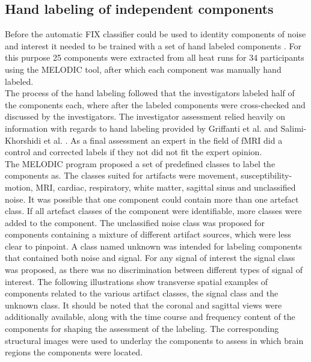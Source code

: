 \subsection{Hand labeling of independent components}
Before the automatic FIX classifier could be used to identity components of noise and interest it needed to be trained with a set of hand labeled components \cite{Salimi-Khorshidi2014}. For this purpose 25 components were extracted from all heat runs for 34 participants using the MELODIC tool, after which each component was manually hand labeled. \\
The process of the hand labeling followed that the investigators labeled half of the components each, where after the labeled components were cross-checked and discussed by the investigators. The investigator assessment relied heavily on information with regards to hand labeling provided by Griffanti et al. \cite{Griffanti2017} and Salimi-Khorshidi et al. \cite{Salimi-Khorshidi2014}. As a final assessment an expert in the field of fMRI did a control and corrected labels if they not did not fit the expert opinion. \\
The MELODIC program proposed a set of predefined classes to label the components as. The classes suited for artifacts were movement, susceptibility-motion, MRI, cardiac, respiratory, white matter, sagittal sinus and unclassified noise. It was possible that one component could contain more than one artefact class. If all artefact classes of the component were identifiable, more classes were added to the component. The unclassified noise class was proposed for components containing a mixture of different artifact sources, which were less clear to pinpoint. A class named unknown was intended for labeling components that contained both noise and signal. For any signal of interest the signal class was proposed, as there was no discrimination between different types of signal of interest. 
The following illustrations show transverse spatial examples of components related to the various artifact classes, the signal class and the unknown class. It should be noted that the coronal and sagittal views were additionally available, along with the time course and frequency content of the components for shaping the assessment of the labeling. The corresponding structural images were used to underlay the components to assess in which brain regions the components were located.


